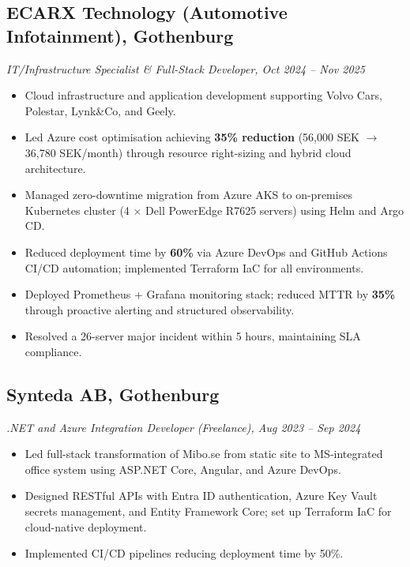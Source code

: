 \documentclass[a4paper,10pt]{article}
\begin{document}
\subsection*{ECARX Technology (Automotive Infotainment), Gothenburg}
\textit{IT/Infrastructure Specialist \& Full-Stack Developer, Oct 2024 -- Nov 2025}
\begin{itemize}[noitemsep]
  \item Cloud infrastructure and application development supporting Volvo Cars, Polestar,
        Lynk\&Co, and Geely.
  \item Led Azure cost optimisation achieving \textbf{35\% reduction}
        (56,000 SEK $\to$ 36,780 SEK/month) through resource right-sizing and hybrid
        cloud architecture.
  \item Managed zero-downtime migration from Azure AKS to on-premises Kubernetes cluster
        (4 $\times$ Dell PowerEdge R7625 servers) using Helm and Argo CD.
  \item Reduced deployment time by \textbf{60\%} via Azure DevOps and GitHub Actions
        CI/CD automation; implemented Terraform IaC for all environments.
  \item Deployed Prometheus + Grafana monitoring stack; reduced MTTR by \textbf{35\%}
        through proactive alerting and structured observability.
  \item Resolved a 26-server major incident within 5 hours, maintaining SLA compliance.
\end{itemize}

\subsection*{Synteda AB, Gothenburg}
\textit{.NET and Azure Integration Developer (Freelance), Aug 2023 -- Sep 2024}
\begin{itemize}[noitemsep]
  \item Led full-stack transformation of Mibo.se from static site to MS-integrated office
        system using ASP.NET Core, Angular, and Azure DevOps.
  \item Designed RESTful APIs with Entra ID authentication, Azure Key Vault secrets
        management, and Entity Framework Core; set up Terraform IaC for cloud-native
        deployment.
  \item Implemented CI/CD pipelines reducing deployment time by 50\%.
\end{itemize}
\end{document}
